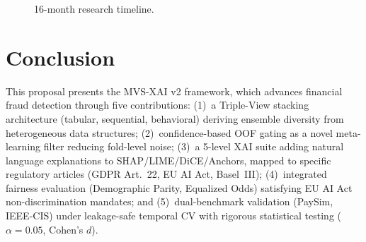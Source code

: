 \documentclass[10pt,a4paper,twocolumn]{article}
\begin{document}
\begin{figure}[H]
\centering
{}
\caption{16-month research timeline.}
\label{fig:gantt}
\end{figure}

\section{Conclusion}
This proposal presents the MVS-XAI v2 framework, which advances financial fraud detection through five contributions: (1)~a Triple-View stacking architecture (tabular, sequential, behavioral) deriving ensemble diversity from heterogeneous data structures; (2)~confidence-based OOF gating as a novel meta-learning filter reducing fold-level noise; (3)~a 5-level XAI suite adding natural language explanations to SHAP/LIME/DiCE/Anchors, mapped to specific regulatory articles (GDPR Art.~22, EU AI Act, Basel~III); (4)~integrated fairness evaluation (Demographic Parity, Equalized Odds) satisfying EU AI Act non-discrimination mandates; and (5)~dual-benchmark validation (PaySim, IEEE-CIS) under leakage-safe temporal CV with rigorous statistical testing ($\alpha{=}0.05$, Cohen's $d$).
\end{document}

